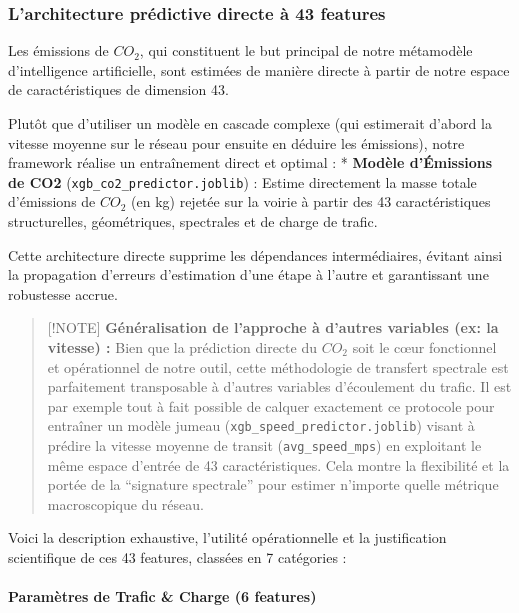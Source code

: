 \documentclass[10pt, a4paper]{article}
\begin{document}
\subsubsection{L'architecture prédictive directe à 43
features}\label{larchitecture-pruxe9dictive-directe-uxe0-43-features}

Les émissions de \(CO_2\), qui constituent le but principal de notre
métamodèle d'intelligence artificielle, sont estimées de manière directe
à partir de notre espace de caractéristiques de dimension 43.

Plutôt que d'utiliser un modèle en cascade complexe (qui estimerait
d'abord la vitesse moyenne sur le réseau pour ensuite en déduire les
émissions), notre framework réalise un entraînement direct et optimal :
* \textbf{Modèle d'Émissions de CO2}
(\texttt{xgb\_co2\_predictor.joblib}) : Estime directement la masse
totale d'émissions de \(CO_2\) (en kg) rejetée sur la voirie à partir
des 43 caractéristiques structurelles, géométriques, spectrales et de
charge de trafic.

Cette architecture directe supprime les dépendances intermédiaires,
évitant ainsi la propagation d'erreurs d'estimation d'une étape à
l'autre et garantissant une robustesse accrue.

\begin{quote}
{[}!NOTE{]} \textbf{Généralisation de l'approche à d'autres variables
(ex: la vitesse) :} Bien que la prédiction directe du \(CO_2\) soit le
cœur fonctionnel et opérationnel de notre outil, cette méthodologie de
transfert spectrale est parfaitement transposable à d'autres variables
d'écoulement du trafic. Il est par exemple tout à fait possible de
calquer exactement ce protocole pour entraîner un modèle jumeau
(\texttt{xgb\_speed\_predictor.joblib}) visant à prédire la vitesse
moyenne de transit (\texttt{avg\_speed\_mps}) en exploitant le même
espace d'entrée de 43 caractéristiques. Cela montre la flexibilité et la
portée de la ``signature spectrale'' pour estimer n'importe quelle
métrique macroscopique du réseau.
\end{quote}

Voici la description exhaustive, l'utilité opérationnelle et la
justification scientifique de ces 43 features, classées en 7 catégories
:

\paragraph{Paramètres de Trafic \& Charge (6
features)}\label{paramuxe8tres-de-trafic-charge-6-features}
\end{document}
